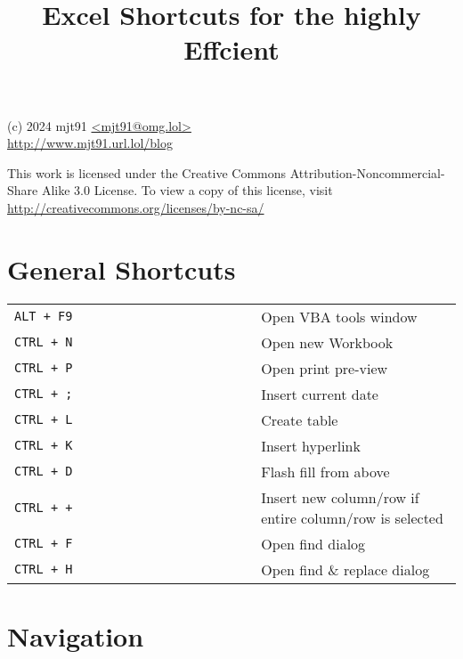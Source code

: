 \documentclass[8pt]{extarticle} %
\begin{document}
\raggedright

\begin{multicols}{2}

\title{Excel Shortcuts for the highly Effcient}

{\small
(c) 2024 mjt91 \url{<mjt91@omg.lol>}\\
\url{http://www.mjt91.url.lol/blog}

This work is licensed under the Creative Commons Attribution-Noncommercial-Share
Alike 3.0 License. To view a copy of this license, visit
\url{http://creativecommons.org/licenses/by-nc-sa/}
}

\vspace*{1pt}

\section{General Shortcuts}

  \vspace{1ex}
  \begin{tabular}{L{0.55\linewidth} L{0.45\linewidth}}

    \tt ALT + F9                & Open VBA tools window \\
    \tt CTRL + N                & Open new Workbook \\
    \tt CTRL + P                & Open print pre-view \\
    \tt CTRL + ;                & Insert current date \\
    \tt CTRL + L                & Create table \\
    \tt CTRL + K                & Insert hyperlink \\
    \tt CTRL + D                & Flash fill from above \\
    \tt CTRL + +                & Insert new column/row if entire column/row is selected \\
    \tt CTRL + F                & Open find dialog \\
    \tt CTRL + H                & Open find \& replace dialog \\

  \end{tabular}
  
\section{Navigation}


\end{multicols}
\end{document}
